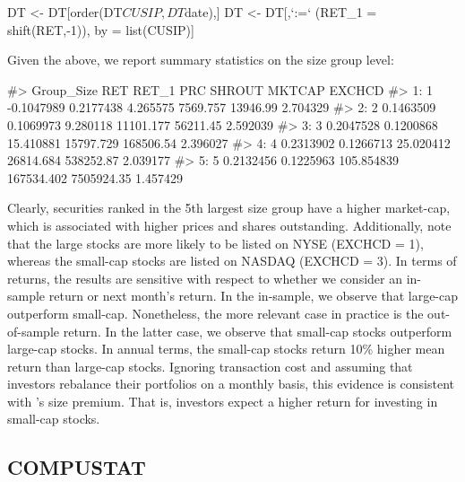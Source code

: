 \begin{Schunk}
\begin{Sinput}
DT <- DT[order(DT$CUSIP,DT$date),]
DT <- DT[,`:=` (RET_1 = shift(RET,-1)), by = list(CUSIP)]
\end{Sinput}
\end{Schunk}
Given the above, we report summary statistics on the size group level:
\begin{Schunk}
\begin{Soutput}
#>    Group_Size        RET     RET_1        PRC     SHROUT     MKTCAP   EXCHCD
#> 1:          1 -0.1047989 0.2177438   4.265575   7569.757   13946.99 2.704329
#> 2:          2  0.1463509 0.1069973   9.280118  11101.177   56211.45 2.592039
#> 3:          3  0.2047528 0.1200868  15.410881  15797.729  168506.54 2.396027
#> 4:          4  0.2313902 0.1266713  25.020412  26814.684  538252.87 2.039177
#> 5:          5  0.2132456 0.1225963 105.854839 167534.402 7505924.35 1.457429
\end{Soutput}
\end{Schunk} %

Clearly, securities ranked in the 5th largest size group have a higher
market-cap, which is associated with  higher prices and shares
outstanding. Additionally, note that the large stocks are more likely to
be listed on NYSE (EXCHCD = 1), whereas the small-cap stocks are listed
on NASDAQ (EXCHCD = 3). In terms of returns, the results are sensitive
with respect to whether we consider an in-sample return or next month's return. In the in-sample, we observe that large-cap outperform small-cap. Nonetheless, the more relevant case in practice is the
out-of-sample return. In the latter case, we observe that small-cap
stocks outperform large-cap stocks. In annual terms, the small-cap stocks return 10\% higher mean return than large-cap stocks. Ignoring transaction cost and assuming that
investors rebalance their portfolios on a monthly basis, this evidence
is consistent with 
\cite{fama1993common}'s size premium. That is, investors expect
a higher return for investing in small-cap stocks.

\hypertarget{compustat}{%
\subsection{COMPUSTAT}\label{compustat}}

